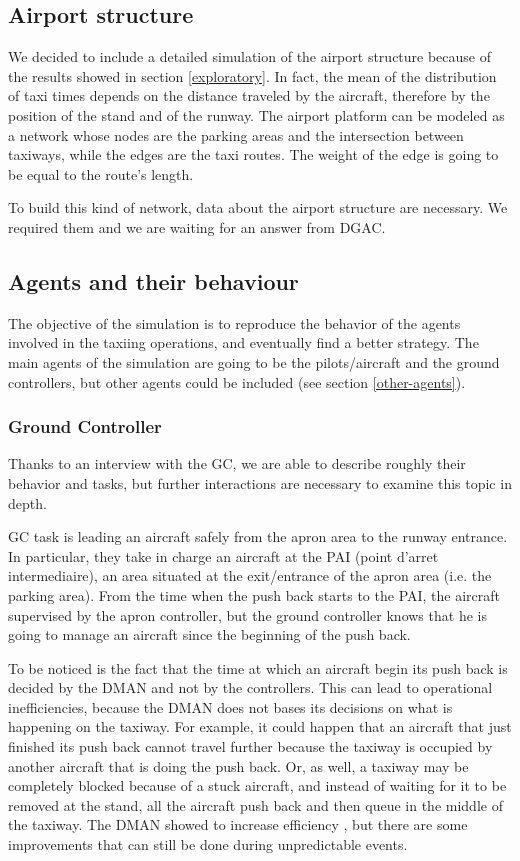 \documentclass{article}
\begin{document}
\subsection{Airport structure}

We decided to include a detailed simulation of the airport structure because of the results showed in section \ref{exploratory}. In fact, the mean of the distribution of taxi times depends on the distance traveled by the aircraft, therefore by the position of the stand and of the runway. The airport platform can be modeled as a network whose nodes are the parking areas and the intersection between taxiways, while the edges are the taxi routes. The weight of the edge is going to be equal to the route's length.

To build this kind of network, data about the airport structure are necessary. We required them and we are waiting for an answer from DGAC.

\subsection{Agents and their behaviour}
The objective of the simulation is to reproduce the behavior of the agents involved in the taxiing operations, and eventually find a better strategy. 
The main agents of the simulation are going to be the pilots/aircraft and the ground controllers, but other agents could be included (see section  \ref{other-agents}).

\subsubsection{Ground Controller}

Thanks to an interview with the GC, we are able to describe roughly their behavior and tasks, but further interactions are necessary to examine this topic in depth. 

GC task is leading an aircraft safely from the apron area to the runway entrance. In particular, they take in charge an aircraft at the PAI (point d'arret intermediaire), an area situated at the exit/entrance of the apron area (i.e. the parking area). From the time when the push back starts to the PAI, the aircraft supervised by the apron controller, but the ground controller knows that he is going to manage an aircraft since the beginning of the push back. 

To be noticed is the fact that the time at which an aircraft begin its push back is decided by the DMAN and not by the controllers. This can lead to operational inefficiencies, because the DMAN does not bases its decisions on what is happening on the taxiway. For example, it could happen that an aircraft that just finished its push back cannot travel further because the taxiway is occupied by another aircraft that is doing the push back. Or, as well, a taxiway may be completely blocked because of a stuck aircraft, and instead of waiting for it to be removed at the stand, all the aircraft push back and then queue in the middle of the taxiway. The DMAN showed to increase efficiency \cite{manual}, but there are some improvements that can still be done during unpredictable events.
\end{document}
